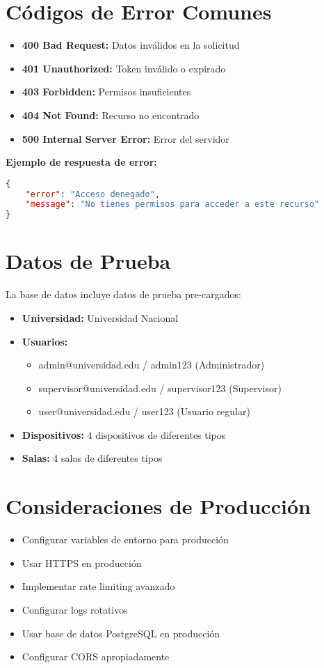 \documentclass[12pt,a4paper]{article}
\begin{document}
\section{Códigos de Error Comunes}

\begin{itemize}
\item \textbf{400 Bad Request:} Datos inválidos en la solicitud
\item \textbf{401 Unauthorized:} Token inválido o expirado
\item \textbf{403 Forbidden:} Permisos insuficientes
\item \textbf{404 Not Found:} Recurso no encontrado
\item \textbf{500 Internal Server Error:} Error del servidor
\end{itemize}

\textbf{Ejemplo de respuesta de error:}
\begin{lstlisting}[language=JSON]
{
    "error": "Acceso denegado",
    "message": "No tienes permisos para acceder a este recurso"
}
\end{lstlisting}

\section{Datos de Prueba}

La base de datos incluye datos de prueba pre-cargados:

\begin{itemize}
\item \textbf{Universidad:} Universidad Nacional
\item \textbf{Usuarios:}
  \begin{itemize}
  \item admin@universidad.edu / admin123 (Administrador)
  \item supervisor@universidad.edu / supervisor123 (Supervisor)
  \item user@universidad.edu / user123 (Usuario regular)
  \end{itemize}
\item \textbf{Dispositivos:} 4 dispositivos de diferentes tipos
\item \textbf{Salas:} 4 salas de diferentes tipos
\end{itemize}

\section{Consideraciones de Producción}

\begin{itemize}
\item Configurar variables de entorno para producción
\item Usar HTTPS en producción
\item Implementar rate limiting avanzado
\item Configurar logs rotativos
\item Usar base de datos PostgreSQL en producción
\item Configurar CORS apropiadamente
\end{itemize}
\end{document}
